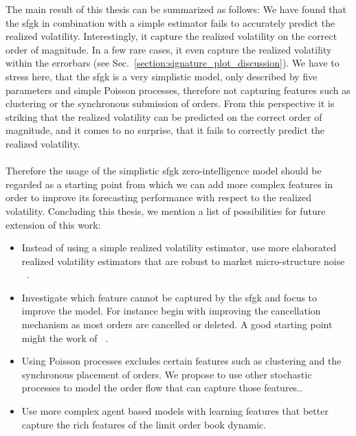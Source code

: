 \documentclass[11pt, a4paper]{thesis}  %
\begin{document}
The main result of this thesis can be summarized as follows: We have found that the \ac{sfgk} in  combination with a simple estimator fails to accurately predict the realized volatility. Interestingly, it capture the realized volatility on the correct order of magnitude. In a few rare cases, it even capture the realized volatility within the errorbars (see Sec.~\ref{section:signature_plot_discussion}). We have to stress here, that the \ac{sfgk} is a very simplistic model, only described by five parameters and simple Poisson processes, therefore not capturing features such as clustering or the synchronous submission of orders.  From this perspective it is striking that the realized volatility can be predicted on the correct order of magnitude, and it comes to no surprise, that it fails to correctly predict the realized volatility. 
%
\\
\\
\noindent Therefore the usage of the simplistic \ac{sfgk} zero-intelligence model should be regarded as a starting point from which we can add more complex features in order to improve its forecasting performance with respect to the realized volatility. Concluding this thesis, we mention a list of possibilities for future extension of this work:

\begin{itemize}

	\item Instead of using a simple realized volatility estimator, use more elaborated realized volatility estimators that are robust to market micro-structure noise ~\cite{Andersen:2010:volatility_measurement}.
	
	\item Investigate which feature cannot be captured by the \ac{sfgk} and focus to improve the model. For instance begin with improving the cancellation mechanism as most orders are cancelled or deleted. A good starting point might the work of 	\citeauthor{Cont:2010:model}~\cite{Cont:2010:model}.
	
	\item Using Poisson processes excludes certain features such as clustering and the synchronous placement of  orders. We propose to use other stochastic processes to model the order flow that can capture those features..	

	\item Use more complex agent based models with learning features that better capture the rich features of the limit order book dynamic.
	
\end{itemize}
 
\end{document}
